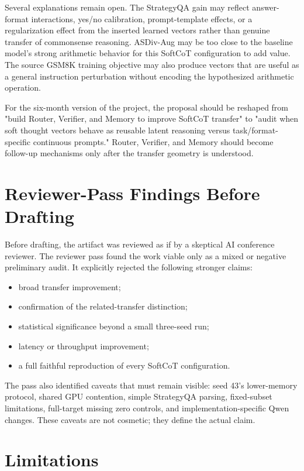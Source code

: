 \documentclass{article}
\begin{document}
Several explanations remain open. The StrategyQA gain may reflect answer-format interactions, yes/no calibration, prompt-template effects, or a regularization effect from the inserted learned vectors rather than genuine transfer of commonsense reasoning. ASDiv-Aug may be too close to the baseline model's strong arithmetic behavior for this SoftCoT configuration to add value. The source GSM8K training objective may also produce vectors that are useful as a general instruction perturbation without encoding the hypothesized arithmetic operation.

For the six-month version of the project, the proposal should be reshaped from "build Router, Verifier, and Memory to improve SoftCoT transfer" to "audit when soft thought vectors behave as reusable latent reasoning versus task/format-specific continuous prompts." Router, Verifier, and Memory should become follow-up mechanisms only after the transfer geometry is understood.

\section{Reviewer-Pass Findings Before Drafting}

Before drafting, the artifact was reviewed as if by a skeptical AI conference reviewer. The reviewer pass found the work viable only as a mixed or negative preliminary audit. It explicitly rejected the following stronger claims:

\begin{itemize}
  \item broad transfer improvement;
  \item confirmation of the related-transfer distinction;
  \item statistical significance beyond a small three-seed run;
  \item latency or throughput improvement;
  \item a full faithful reproduction of every SoftCoT configuration.
\end{itemize}

The pass also identified caveats that must remain visible: seed 43's lower-memory protocol, shared GPU contention, simple StrategyQA parsing, fixed-subset limitations, full-target missing zero controls, and implementation-specific Qwen changes. These caveats are not cosmetic; they define the actual claim.

\section{Limitations}
\end{document}
